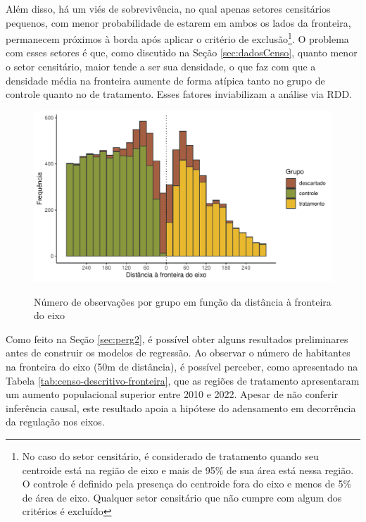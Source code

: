Além disso, há um viés de sobrevivência, no qual apenas setores censitários pequenos, com menor probabilidade de estarem em ambos os lados da fronteira, permanecem próximos à borda após aplicar o critério de exclusão\footnote{No caso do setor censitário, é considerado de tratamento quando seu centroide está na região de eixo e mais de 95\% de sua área está nessa região. O controle é definido pela presença do centroide fora do eixo e menos de 5\% de área de eixo. Qualquer setor censitário que não cumpre com algum dos critérios é excluído}. O problema com esses setores é que, como discutido na Seção \ref{sec:dadosCenso}, quanto menor o setor censitário, maior tende a ser sua densidade, o que faz com que a densidade média na fronteira aumente de forma atípica tanto no grupo de controle quanto no de tratamento. Esses fatores inviabilizam a análise via RDD.

\begin{figure}[!h]
    \centering
    \caption{Número de observações por grupo em função da distância à fronteira do eixo}
    \includegraphics[width = .75\textwidth]{figuras/rdd-balanceamento-censo.pdf}
    \label{fig:rdd-densidade-censo}
\end{figure}

Como feito na Seção \ref{sec:perg2}, é possível obter alguns resultados preliminares antes de construir os modelos de regressão. Ao observar o número de habitantes na fronteira do eixo (50m de distância), é possível perceber, como apresentado na Tabela \ref{tab:censo-descritivo-fronteira}, que as regiões de tratamento apresentaram um aumento populacional superior entre 2010 e 2022. Apesar de não conferir inferência causal, este resultado apoia a hipótese do adensamento em decorrência da regulação nos eixos.



